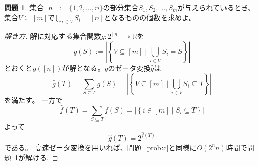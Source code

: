 \documentclass[a4paper,twoside,onecolumn,openany,article,10pt]{memoir}
\theoremstyle{definition}
\newtheorem{problem}{問題}
\theoremstyle{remark}
\begin{document}
\begin{problem}\label{prob:s}
集合$[n]:=\{1,2,\dotsc,n\}$の部分集合$S_1,S_2,\dotsc,S_m$が与えられているとき、
集合$V\subseteq [m]$で$\bigcup_{i\in V} S_{i}=[n]$となるものの個数を求めよ。
\end{problem}
\begin{proof}[解き方]
解に対応する集合関数$g\colon 2^{[n]}\to\mathbb{R}$を
\begin{equation*}
g(S) := \left|\left\{V\subseteq[m] \mid \bigcup_{i\in V} S_{i}=S\right\}\right|
\end{equation*}
とおくと$g([n])$が解となる。$g$のゼータ変換$\widehat{g}$は
\begin{equation*}
\widehat{g}(T) = \sum_{S\subseteq T}g(S) =
\left|\left\{V\subseteq[m] \mid \bigcup_{i\in V} S_{i}\subseteq T\right\}\right|
\end{equation*}
を満たす。
一方で
\begin{equation*}
\widehat{f}(T) = \sum_{S\subseteq T}f(S) =
\left|\left\{i\in[m] \mid S_i\subseteq T\right\}\right|
\end{equation*}
よって
\begin{equation*}
\widehat{g}(T) = 2^{\widehat{f}(T)}
\end{equation*}
である。
高速ゼータ変換を用いれば、問題~\ref{prob:c}と同様に$O(2^nn)$時間で問題~\ref{prob:s}が解ける.
\end{proof}
\end{document}
